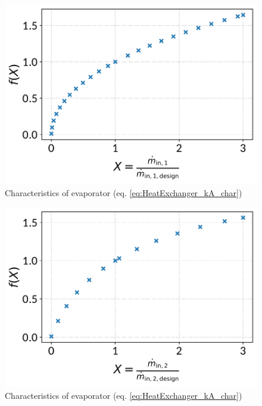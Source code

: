 \documentclass[]{article}
\begin{document}
\begin{minipage}{0.5\textwidth}
\begin{figure}[H]\begin{center}
\includegraphics[width=\textwidth]{figures/HeatExchanger_CharLine_kA_char1_evaporator.pdf}
\caption{Characteristics of evaporator (eq. \ref{eq:HeatExchanger_kA_char})}
\label{fig:CharLine_kA_char1_evaporator}
\end{center}\end{figure}

\end{minipage}
\begin{minipage}{0.5\textwidth}
\begin{figure}[H]\begin{center}
\includegraphics[width=\textwidth]{figures/HeatExchanger_CharLine_kA_char2_evaporator.pdf}
\caption{Characteristics of evaporator (eq. \ref{eq:HeatExchanger_kA_char})}
\label{fig:CharLine_kA_char2_evaporator}
\end{center}\end{figure}

\end{minipage}
\end{document}
